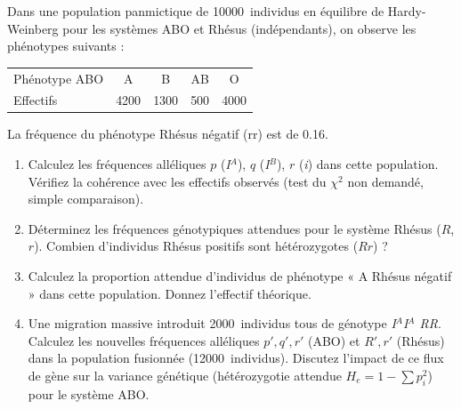 \documentclass[11pt]{article}
\begin{document}
\begin{exercice}
Dans une population panmictique de \SI{10000}{individus} en équilibre de Hardy-Weinberg pour les systèmes ABO et Rhésus (indépendants), on observe les phénotypes suivants : 
\begin{center}
\begin{tabular}{lcccc}
\hline
Phénotype ABO & A & B & AB & O \\
Effectifs & 4200 & 1300 & 500 & 4000 \\
\hline
\end{tabular}
\end{center}
La fréquence du phénotype Rhésus négatif (rr) est de \num{0.16}.

\begin{enumerate}
    \item Calculez les fréquences alléliques $p$ (\textit{I$^A$}), $q$ (\textit{I$^B$}), $r$ (\textit{i}) dans cette population. Vérifiez la cohérence avec les effectifs observés (test du $\chi^2$ non demandé, simple comparaison).
    \item Déterminez les fréquences génotypiques attendues pour le système Rhésus ($R$, $r$). Combien d'individus Rhésus positifs sont hétérozygotes ($Rr$) ?
    \item Calculez la proportion attendue d'individus de phénotype « A Rhésus négatif » dans cette population. Donnez l'effectif théorique.
    \item Une migration massive introduit \SI{2000}{individus} tous de génotype \textit{I$^A$I$^A$ RR}. Calculez les nouvelles fréquences alléliques $p', q', r'$ (ABO) et $R', r'$ (Rhésus) dans la population fusionnée (\SI{12000}{individus}). Discutez l'impact de ce flux de gène sur la variance génétique (hétérozygotie attendue $H_e = 1 - \sum p_i^2$) pour le système ABO.
\end{enumerate}
\end{exercice}
\end{document}
